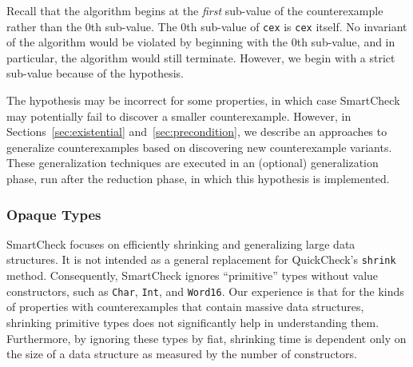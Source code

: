 \documentclass{sigplanconf}
\newenvironment{code}{\begin{alltt}\footnotesize}{\end{alltt}}
\newcommand{\ttp}[1]{\texttt{#1}}
\begin{document}
Recall that the algorithm begins at the \emph{first} sub-value of the
counterexample rather than the 0th sub-value.  The 0th sub-value of \ttp{cex} is
\ttp{cex} itself.  No invariant of the algorithm would be violated by beginning
with the 0th sub-value, and in particular, the algorithm would still terminate.
However, we begin with a strict sub-value because of the hypothesis.

The hypothesis may be incorrect for some properties, in which case SmartCheck
may potentially fail to discover a smaller counterexample.  However, in
Sections~\ref{sec:existential} and~\ref{sec:precondition}, we describe an
approaches to generalize counterexamples based on discovering new counterexample
variants.  These generalization techniques are executed in an (optional)
generalization phase, run after the reduction phase, in which this hypothesis is
implemented.



\subsubsection{Opaque Types}\label{sec:base}

SmartCheck focuses on efficiently shrinking and generalizing large data
structures.  It is not intended as a general replacement for QuickCheck's
\ttp{shrink} method.  Consequently, SmartCheck ignores ``primitive'' types
without value constructors, such as \ttp{Char}, \ttp{Int}, and \ttp{Word16}.
Our experience is that for the kinds of properties with counterexamples that
contain massive data structures, shrinking primitive types does not
significantly help in understanding them.  Furthermore, by ignoring these types
by fiat, shrinking time is dependent only on the size of a data structure as
measured by the number of constructors.
\end{document}
